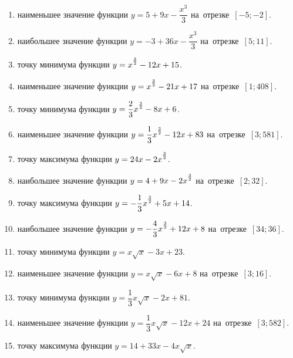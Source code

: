 \documentclass[a4paper,10pt]{article}
\begin{document}
\begin{enumerate}
\item {} наименьшее значение функции $y=5 +9x-\dfrac{x^3}{3}$ на~отрезке~$\left[-5;-2\right]$.

\item {} наибольшее значение функции $y=-3 +36x-\dfrac{x^3}{3}$ на~отрезке~$\left[5;11\right]$.

\item {} точку минимума функции $y=x\strut^{\frac{3}{2}} -12x+15$.

\item {} наименьшее значение функции $y=x\strut^{\frac{3}{2}} -21x+17$ на~отрезке~$\left[1;408\right]$.

\item {} точку минимума функции $y=\dfrac{2}{3}x\strut^{\frac{3}{2}} -8x+6$.

\item {} наименьшее значение функции $y=\dfrac{1}{3}x\strut^{\frac{3}{2}} -12x+83$ на~отрезке~$\left[3;581\right]$.

\item {} точку максимума функции $y=24x-2x\strut^{\frac{3}{2}}$.

\item {} наибольшее значение функции $y=4+9x-2x\strut^{\frac{3}{2}}$ на~отрезке~$\left[2;32\right]$.

\item {} точку максимума функции $y=-\dfrac{1}{3}x\strut^{\frac{3}{2}} +5x+14$.

\item {} наибольшее значение функции $y=-\dfrac{4}{3}x\strut^{\frac{3}{2}} +12x+8$ на~отрезке~$\left[34;36\right]$.

\item {} точку минимума функции $y=x\sqrt{x} -3x+23$.

\item {} наименьшее значение функции $y=x\sqrt{x} -6x+8$ на~отрезке~$\left[3;16\right]$.

\item {} точку минимума функции $y=\dfrac{1}{3}x\sqrt{x} -2x+81$.

\item {} наименьшее значение функции $y=\dfrac{1}{3}x\sqrt{x} -12x+24$ на~отрезке~$\left[3;582\right]$.

\item {} точку максимума функции $y=14+33x -4x\sqrt{x}$.


\end{enumerate}
\end{document}
